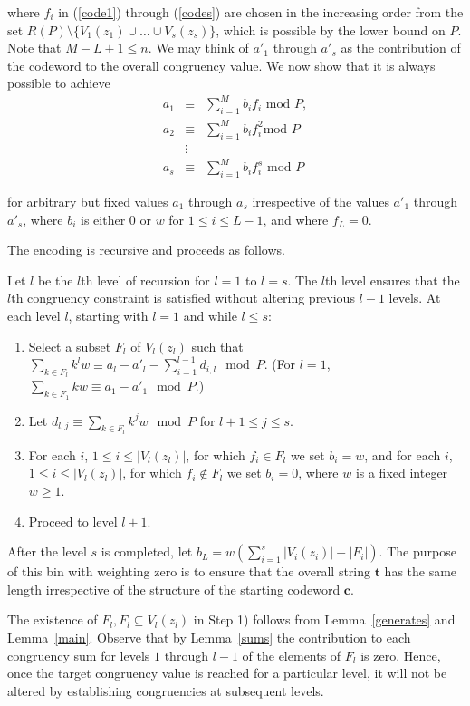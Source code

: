 where $f_i$ in (\ref{code1}) through (\ref{codes}) are chosen in
the increasing order from the set $R(P)\setminus \{V_1(z_1) \cup
\dots \cup V_s(z_s) \}$, which is possible by the lower bound on
$P$. Note that $M-L+1 \leq n $. We may think of ${a'}_1$ through
${a'}_s$ as the contribution of the codeword to the overall
congruency value. We now show that it is always possible to
achieve
\begin{eqnarray}\label{s1} a_1 &\equiv& \sum_{i=1}^M b_i f_i
\text{ mod } P, \\ a_2 &\equiv& \sum_{i=1}^M b_i f_i^2 \text{
mod } P\\ &\vdots& \\
a_s &\equiv& \sum_{i=1}^M b_i f_i^s \text{ mod }
P\label{s2}\end{eqnarray}

for arbitrary but fixed values $a_1$ through $a_s$ irrespective of
the values ${a'}_1$ through ${a'}_s$, where $b_i$ is either $0$ or
$w$ for $1 \leq i \leq L-1$, and where $f_L=0$.

The encoding is recursive and proceeds as follows.

Let $l$ be the $l$th level of recursion for $l=1$ to $l=s$. The
$l$th level ensures that the $l$th congruency constraint is
satisfied without altering previous $l-1$ levels.
 At each level $l$, starting with $l=1$ and while $l \leq s$:
\begin{enumerate}
 \item Select a subset $F_{l}$ of $V_l(z_l)$ such that $\sum_{k \in F_l} k^lw \equiv a_l - {a'}_l -
\sum_{i=1}^{l-1} d_{i,l} \mod P$. (For $l=1$, $\sum_{k \in F_1} kw
\equiv a_1 - {a'}_1 \mod P$.)\item Let $d_{l,j} \equiv \sum_{k \in
F_l} k^jw \mod P$ for $l+1 \leq j\leq s$. \item For each $i$, $1
\leq i \leq |V_l(z_l)|$, for which $f_i \in F_l$ we set $b_i=w$,
and for each $i$, $1 \leq i \leq |V_l(z_l)|$, for which $f_i
\notin F_l$ we set $b_i=0$, where $w$ is a fixed integer $w \geq
1$. \item Proceed to level $l+1$.
\end{enumerate}

After the level $s$ is completed, let $b_L=w(\sum_{i=1}^s
|V_i(z_i)|- |F_{i}|)$. The purpose of this bin with weighting zero
is to ensure that the overall string $\mathbf{t}$ has the same
length irrespective of the structure of the starting codeword
$\mathbf{c}$.

The existence of $F_l, F_l \subseteq V_l(z_l)$ in Step 1) follows
from Lemma~\ref{generates} and Lemma~\ref{main}. Observe that by
Lemma~\ref{sums} the contribution to each congruency sum for
levels $1$ through $l-1$ of the elements of $F_l$ is zero. Hence,
once the target congruency value is reached for a particular
level, it will not be altered by establishing congruencies at
subsequent levels.
